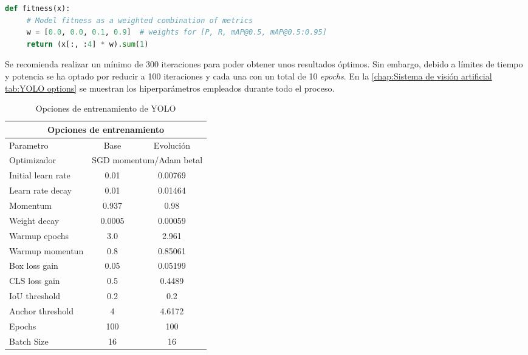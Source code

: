 \begin{lstlisting}[language=Python]
 def fitness(x): 
     # Model fitness as a weighted combination of metrics 
     w = [0.0, 0.0, 0.1, 0.9]  # weights for [P, R, mAP@0.5, mAP@0.5:0.95] 
     return (x[:, :4] * w).sum(1) 
\end{lstlisting}

Se recomienda realizar un mínimo de 300 iteraciones para poder obtener unos resultados óptimos. Sin embargo, debido a límites de tiempo y potencia se ha optado por reducir a 100 iteraciones y cada una con un total de 10 \textit{epochs}. En la \autoref{chap:Sistema de visión artificial tab:YOLO options} se muestran los hiperparámetros empleados durante todo el proceso.

\begin{table}[ht]
  \centering
    \begin{tabular}{|l|c|c|}
    \hline
    \multicolumn{3}{|c|}{Opciones de entrenamiento} \\
    \hline
    Parametro & Base & Evolución \\
    \hline
    Optimizador & \multicolumn{2}{|c|}{SGD momentum/Adam betal} \\
    \hline
    Initial learn rate & 0.01 & 0.00769 \\
    \hline
    Learn rate decay & 0.01 & 0.01464 \\
    \hline
    Momentum & 0.937 & 0.98 \\
    \hline
    Weight decay & 0.0005 & 0.00059 \\
    \hline
    Warmup epochs & 3.0 & 2.961 \\
    \hline
    Warmup momentun & 0.8 & 0.85061 \\
    \hline
    Box loss gain & 0.05 & 0.05199 \\
    \hline
    CLS loss gain & 0.5 & 0.4489 \\
    \hline
    IoU threshold & 0.2 & 0.2 \\
    \hline
    Anchor threshold & 4 & 4.6172 \\
    \hline
    Epochs & 100 & 100 \\
    \hline
    Batch Size & 16 & 16 \\
    \hline
    \end{tabular}
  \caption{Opciones de entrenamiento de YOLO}
  \label{chap:Sistema de visión artificial tab:YOLO options}
\end{table}


